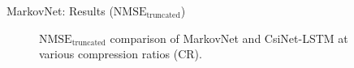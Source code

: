 \documentclass{beamer}
\begin{document}
  \begin{frame}{MarkovNet: Results ($\text{NMSE}_{\text{truncated}}$)}
    \begin{figure}[!hbtp] \centering 
      \vspace*{-3mm}

      \caption{$\text{NMSE}_{\text{truncated}}$ comparison of MarkovNet and CsiNet-LSTM 
      at various compression ratios (CR).} 
      \label{fig:diffnet_result} \vspace*{-2mm}
    \end{figure}  
  \end{frame}
\end{document}
